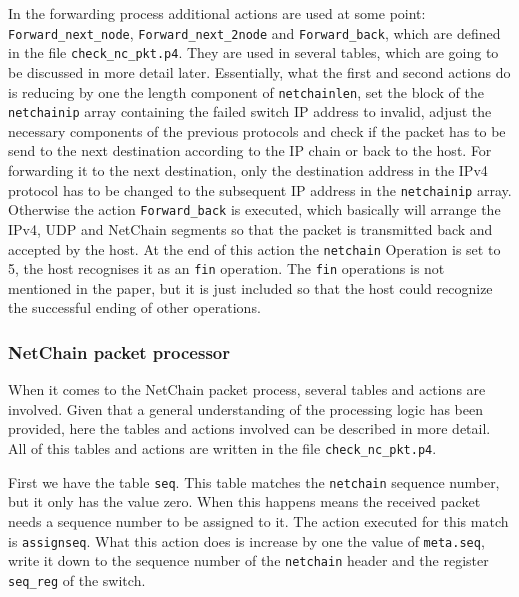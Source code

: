 \documentclass[11pt,oneside,a4paper]{article}
\begin{document}
In the forwarding process additional actions are used at some point: {\color{red}\texttt{Forward\_next\_node}}, {\color{red}\texttt{Forward\_next\_2node}} and {\color{red}\texttt{Forward\_back}}, which are defined in the file {\color{red}\texttt{check\_nc\_pkt.p4}}. They are used in several tables, which are going to be discussed in more detail later. Essentially, what the first and second actions do is reducing by one the length component of {\color{red}\texttt{netchainlen}}, set the block of the {\color{red}\texttt{netchainip}} array containing the failed switch IP address to invalid, adjust the necessary components of the previous protocols and check if the packet has to be send to the next destination according to the IP chain or back to the host. For forwarding it to the next destination, only the destination address in the IPv4 protocol has to be changed to the subsequent IP address in the {\color{red}\texttt{netchainip}} array. Otherwise the action {\color{red}\texttt{Forward\_back}} is executed, which basically will arrange the IPv4, UDP and NetChain segments so that the packet is transmitted back and accepted by the host. At the end of this action the {\color{red}\texttt{netchain}} Operation is set to 5, the host recognises it as an {\color{brown}\texttt{fin}} operation. The {\color{brown}\texttt{fin}} operations is not mentioned in the paper, but it is just included so that the host could recognize the successful ending of other operations.

\subsubsection{NetChain packet processor}

When it comes to the NetChain packet process, several tables and actions are involved. Given that a general understanding of the processing logic has been provided, here the tables and actions involved can be described in more detail. All of this tables and actions are written in the file {\color{red}\texttt{check\_nc\_pkt.p4}}. 

First we have the table {\color{red}\texttt{seq}}. This table matches the {\color{red}\texttt{netchain}} sequence number, but it only has the value zero. When this happens means the received packet needs a sequence number to be assigned to it. The action executed for this match is {\color{red}\texttt{assignseq}}. What this action does is increase by one the value of {\color{red}\texttt{meta.seq}}, write it down to the sequence number of the {\color{red}\texttt{netchain}} header and the register {\color{red}\texttt{seq\_reg}} of the switch.
\end{document}
